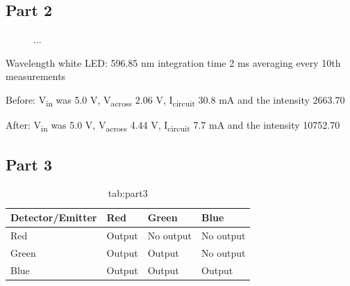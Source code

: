 \subsection{Part 2}

\begin{figure}[H]
    \centering
    \hfill
    \caption{...}
    \label{fig:part2}
\end{figure}

Wavelength white LED: 596.85 nm 
integration time 2 ms 
averaging every 10th measurements

Before: V\textsubscript{in} was 5.0 V, V\textsubscript{across} 2.06 V, I\textsubscript{circuit} 30.8 mA and the intensity 2663.70

After: V\textsubscript{in} was 5.0 V, V\textsubscript{across} 4.44 V, I\textsubscript{circuit} 7.7 mA and the intensity 10752.70


\subsection{Part 3}

\begin{table}[H]
    \centering
    \begin{tabular}{@{}llll@{}}
    \toprule
    Detector/Emitter & Red    & Green     & Blue      \\ \midrule
    Red              & Output & No output & No output \\
    Green            & Output & Output    & No output \\
    Blue             & Output & Output    & Output    \\ \bottomrule
    \end{tabular}
    \caption{tab:part3}
\end{table}